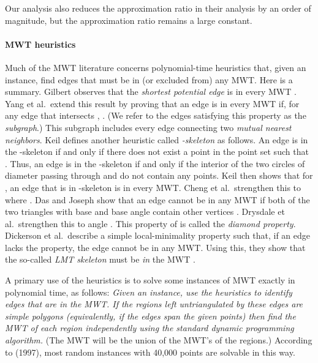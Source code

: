 \documentclass[final]{siamltex}
\begin{document}
Our analysis also reduces the approximation ratio in their analysis by an order of magnitude, 
but the approximation ratio remains a large constant.

\paragraph{MWT heuristics}
Much of the MWT literature concerns polynomial-time heuristics that, given an instance, 
find edges that must be in (or excluded from) any MWT.
Here is a summary.
Gilbert observes that the {\em shortest potential edge} is in every MWT \cite{gilbert1979new}.
Yang et al.~extend this result by proving that an edge  is in every MWT 
if, for any edge  that intersects ,
 \cite{yang1994chain}.
(We refer to the edges satisfying this property as the {\em  subgraph}.)
This subgraph includes every edge connecting two {\em mutual nearest neighbors}. 
Keil \cite{keil1994computing} defines another heuristic called {\em -skeleton} as follows. 
An edge  is in the -skeleton if and only if there does not exist a point 
in the point set such that . 
Thus, an edge  is in the -skeleton if and only if 
the interior of the two circles of diameter 
 passing through  and  do not contain any points.
Keil \cite{keil1994computing} then shows that for , an edge that is in 
-skeleton is in every MWT. 
Cheng et al.~strengthen this to  where  \cite{cheng1996approaching}.
Das and Joseph show that an edge  cannot be in any MWT if
both of the two triangles with base  and base angle  
contain other vertices \cite{das1989triangulations}. 
Drysdale et al.~strengthen this to angle  \cite{drysdale2001exclusion}.
This property of  is called the {\em diamond property}.
Dickerson et al.~describe a simple local-minimality property such that,
if an edge  lacks the property,
the edge cannot be in any MWT.
Using this, they show that the so-called
{\em LMT skeleton} must be {\em in} the MWT
\cite{dickerson1997large}.

A primary use of the heuristics is to solve
some instances of MWT exactly in polynomial time, as follows:
{\em Given an instance, use the heuristics to identify edges that are in the MWT.
If the regions left untriangulated by these edges are simple polygons
(equivalently, if the edges span the given points)
then find the MWT of each region independently
using the standard dynamic programming algorithm.}
(The MWT will be the union of the MWT's of the regions.)
According to \cite{dickerson1997large} (1997),
most random instances with 40,000 points are solvable in this way.
\end{document}
